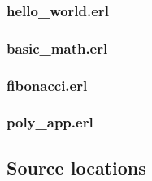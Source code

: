 \documentclass[11 pt]{IEEEtran}
\begin{document}
    \subsubsection{hello\_world.erl} \label{hw}\hfill
    
    
    \subsubsection{basic\_math.erl} \label{bm}\hfill
    

    \subsubsection{fibonacci.erl} \label{fib}\hfill
    
    
    \subsubsection{poly\_app.erl} \label{pa}\hfill
    
\subsection{Source locations}
\end{document}
